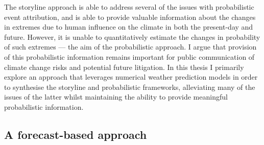     The storyline approach is able to address several of the issues with probabilistic event attribution, and is able to provide valuable information about the changes in extremes due to human influence on the climate in both the present-day and future. However, it is unable to quantitatively estimate the changes in probability of such extremes --- the aim of the probabilistic approach. I argue that provision of this probabilistic information remains important for public communication of climate change risks and potential future litigation. In this thesis I primarily explore an approach that leverages numerical weather prediction models in order to synthesise the storyline and probabilistic frameworks, alleviating many of the issues of the latter whilst maintaining the ability to provide meaningful probabilistic information.

  \subsection{A forecast-based approach}\label{intro:forecast}


